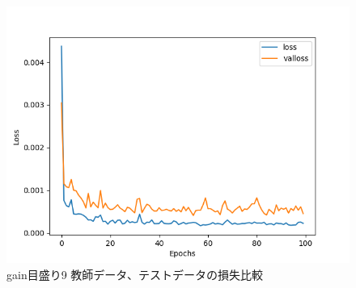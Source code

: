 \documentclass{jreport}		%
\begin{document}
\begin{figure}[htbp]
 \begin{center}
  \includegraphics[width=150mm]{gain10_loss_hikaku.png}
 \end{center}
 \caption{gain目盛り9 教師データ、テストデータの損失比較}
 \label{fig:one}
\end{figure}
\end{document}
